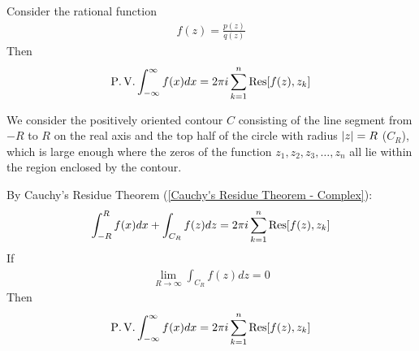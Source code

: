 \documentclass[12pt, english]{book}
\makeatletter
\renewenvironment{proof}[1][\proofname]{\par
	\pushQED{\qed}%
	\normalfont \topsep6\p@\@plus6\p@\relax
	\list{}{%
		\settowidth{\leftmargin}{\itshape\proofname:\hskip\labelsep}%
		\setlength{\labelwidth}{0pt}%
		\setlength{\itemindent}{-\leftmargin}%
	}%
	\item[\hskip\labelsep\itshape#1\@addpunct{:}]\ignorespaces
	}{ \popQED\endlist\@endpefalse}
\makeatother
\begin{document}
	\begin{theorem}
		Consider the rational function 
		\begin{align*}
			f(z) = \frac{p(z)}{q(z)}
		\end{align*}
		Then
		\begin{align*}
			\operatorname{P.V.} \int_{-\infty}^{\infty} f(x) dx = 2\pi i \sum_{k=1}^{n} \Res[f(z), z_k]
		\end{align*}
	\end{theorem}
	\begin{proof}
		We consider the positively oriented contour \(C\) consisting of the line segment from \(-R\) to \(R\) on the real axis and the top half of the circle with radius \(\abs{z} = R\) (\(C_R\)), which is large enough where the zeros of the function \(z_1, z_2, z_3, \ldots, z_n\) all lie within the region enclosed by the contour. 
		
		\begin{figure}[H]
			\centering
		\end{figure}
		
		By Cauchy's Residue Theorem (\cref{Cauchy's Residue Theorem - Complex}):
		\begin{align*}
			\int_{-R}^{R} f(x) dx + \int_{C_R} f(z) dz = 2\pi i \sum_{k=1}^{n} \Res[f(z), z_k]
		\end{align*}
		If 
		\begin{align*}
			\lim_{R\rightarrow \infty} \int_{C_R} f(z) dz = 0
		\end{align*}
		Then
		\begin{align*}
			\operatorname{P.V.} \int_{-\infty}^{\infty} f(x) dx = 2\pi i \sum_{k=1}^{n} \Res[f(z), z_k]
		\end{align*}
	\end{proof}
	
\end{document}
